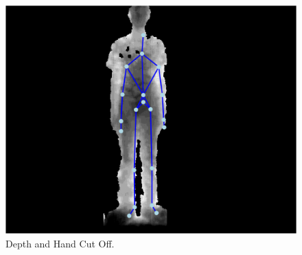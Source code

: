 \begin{figure}[h]
\begin{center}
\includegraphics[scale=0.4]{./design/parse3} 
\end{center}
\caption{Depth and Hand Cut Off.}
\label{fig:depth and hand cut off}
\end{figure} 